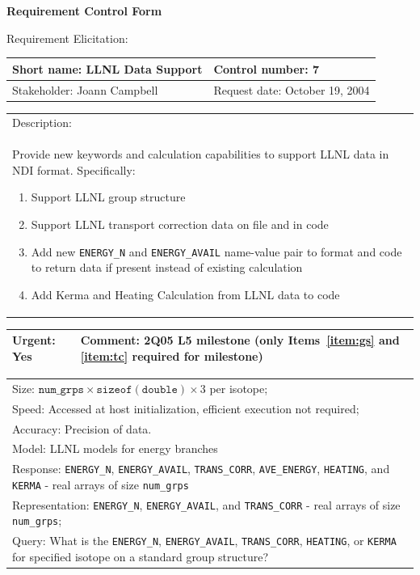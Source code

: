 \begin{center}\Large\bf
Requirement Control Form
\end{center}
\vspace{24pt}

Requirement Elicitation:

\begin{tabular}{|p{211pt}|p{211pt}|} \hline
Short name: LLNL Data Support & Control number: 7\\ \hline
Stakeholder: Joann Campbell & Request date: October 19, 2004\\
\end{tabular}
\begin{tabular}{|p{433pt}|} \hline
Description: \\ Provide new keywords and calculation capabilities to
support LLNL data in NDI format.  Specifically:
\begin{enumerate}
\item Support LLNL group structure \label{item:gs}
\item Support LLNL transport correction data on file and in code \label{item:tc}
\item Add new \texttt{ENERGY\_N} and \texttt{ENERGY\_AVAIL} name-value
pair to format and code to
return data if present instead of existing calculation 
\item Add Kerma and Heating Calculation from LLNL data to code
\end{enumerate} \\ \hline
\end{tabular} 
\begin{tabular}{|p{211pt}|p{211pt}|} \hline
Urgent: Yes & Comment: 2Q05 L5 milestone (only Items~\ref{item:gs} and
\ref{item:tc} required for milestone) \\ \hline
\end{tabular}

\vspace{12pt}

\begin{tabular}{|p{433pt}|} \hline
Size: $\mathtt{num\_grps} \times \mathtt{sizeof(double)} \times 3$ per
isotope; \\ 
Speed: Accessed at host initialization, efficient execution not required; \\
Accuracy: Precision of data. \\ \hline 
Model: LLNL models for energy branches \\ \hline 
Response: \texttt{ENERGY\_N}, \texttt{ENERGY\_AVAIL},
\texttt{TRANS\_CORR}, \texttt{AVE\_ENERGY}, \texttt{HEATING}, and
\texttt{KERMA} - real arrays of size \texttt{num\_grps} \\ \hline
Representation:  \texttt{ENERGY\_N}, \texttt{ENERGY\_AVAIL}, and
\texttt{TRANS\_CORR} - real arrays of size \texttt{num\_grps}; \\ \hline
Query: What is the \texttt{ENERGY\_N}, \texttt{ENERGY\_AVAIL},
\texttt{TRANS\_CORR}, \texttt{HEATING}, or \texttt{KERMA} for specified
isotope on a standard group structure?  \\ \hline
\end{tabular}
\vspace{24pt}

